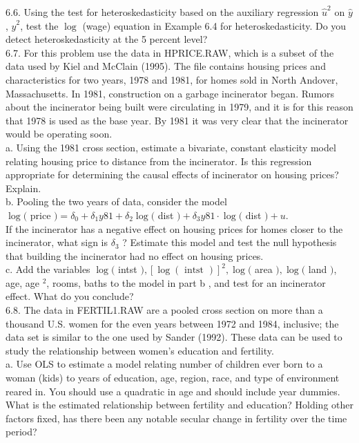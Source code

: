 \documentclass[10pt]{article}
\begin{document}
6.6. Using the test for heteroskedasticity based on the auxiliary regression $\hat{u}^{2}$ on $\hat{y}$, $\hat{y}^{2}$, test the $\log$ (wage) equation in Example 6.4 for heteroskedasticity. Do you detect heteroskedasticity at the 5 percent level?\\
6.7. For this problem use the data in HPRICE.RAW, which is a subset of the data used by Kiel and McClain (1995). The file contains housing prices and characteristics for two years, 1978 and 1981, for homes sold in North Andover, Massachusetts. In 1981, construction on a garbage incinerator began. Rumors about the incinerator being built were circulating in 1979, and it is for this reason that 1978 is used as the base year. By 1981 it was very clear that the incinerator would be operating soon.\\
a. Using the 1981 cross section, estimate a bivariate, constant elasticity model relating housing price to distance from the incinerator. Is this regression appropriate for determining the causal effects of incinerator on housing prices? Explain.\\
b. Pooling the two years of data, consider the model\\
$\log ($ price $)=\delta_{0}+\delta_{1} y 81+\delta_{2} \log ($ dist $)+\delta_{3} y 81 \cdot \log ($ dist $)+u$.\\
If the incinerator has a negative effect on housing prices for homes closer to the incinerator, what sign is $\delta_{3}$ ? Estimate this model and test the null hypothesis that building the incinerator had no effect on housing prices.\\
c. Add the variables $\log ($ intst $),[\log (\text { intst })]^{2}, \log ($ area $), \log ($ land $)$, age, age ${ }^{2}$, rooms, baths to the model in part b , and test for an incinerator effect. What do you conclude?\\
6.8. The data in FERTIL1.RAW are a pooled cross section on more than a thousand U.S. women for the even years between 1972 and 1984, inclusive; the data set is similar to the one used by Sander (1992). These data can be used to study the relationship between women's education and fertility.\\
a. Use OLS to estimate a model relating number of children ever born to a woman (kids) to years of education, age, region, race, and type of environment reared in. You should use a quadratic in age and should include year dummies. What is the estimated relationship between fertility and education? Holding other factors fixed, has there been any notable secular change in fertility over the time period?\\
\end{document}
